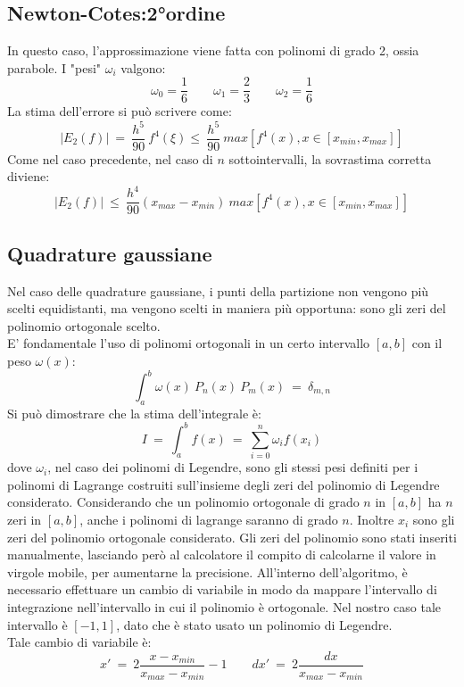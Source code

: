 \subsection*{Newton-Cotes:2°ordine}
In questo caso, l'approssimazione viene fatta con polinomi di grado 2, ossia parabole.
I "pesi" $\omega_i$ valgono:
$$
	\omega_0 = \frac{1}{6} \qquad  \omega_1 = \frac{2}{3} \qquad \omega_2 = \frac{1}{6}
$$
La stima dell'errore si può scrivere come:
$$
|E_2 (f) | \ = \  \frac{h^5}{90} \ f^4(\xi) \leq \ \frac{h^5}{90} \ max \left[ f^4( x), x \in [x_{min},x_{max}] \right]
$$
Come nel caso precedente, nel caso di $n$ sottointervalli, la sovrastima corretta diviene:
$$
|E_2 (f) | \ \leq \ \frac{h^4}{90} \left( x_{max} - x_{min} \right) \ max \left[ f^4( x), x \in [x_{min},x_{max}] \right]
$$

\subsection*{Quadrature gaussiane}
Nel caso delle quadrature gaussiane, i punti della partizione non vengono più scelti equidistanti,
ma vengono scelti in maniera più opportuna: sono gli zeri del polinomio ortogonale scelto.\\
E' fondamentale l'uso di polinomi ortogonali in un certo intervallo $[a,b]$ con il peso $\omega(x)$:
$$
	\int_a^b \omega(x)\ P_n{(x)} \ P_m{(x)} \ = \ \delta_{m,n}
$$
Si può dimostrare che la stima dell'integrale è:
$$
 I \ = \  \int_a^b f(x) \ = \ \sum_{i=0}^n \omega_i f(x_i)
$$
dove $\omega_i$, nel caso dei polinomi di Legendre, sono gli stessi pesi definiti per i polinomi di Lagrange costruiti sull'insieme degli zeri
del polinomio di Legendre considerato. Considerando che un polinomio ortogonale di grado $n$ in $[a,b]$ ha $n$ zeri in $[a,b]$, anche i polinomi
di lagrange saranno di grado $n$. Inoltre $x_i$ sono gli zeri del polinomio ortogonale considerato.
Gli zeri del polinomio sono stati inseriti manualmente, lasciando però al calcolatore il compito di calcolarne il valore in virgole mobile,
per aumentarne la precisione.
All'interno dell'algoritmo, è necessario effettuare un cambio di variabile in modo da mappare l'intervallo
di integrazione nell'intervallo in cui il polinomio è ortogonale. Nel nostro caso tale intervallo è $[-1,1]$,
dato che è stato usato un polinomio di Legendre.\\
Tale cambio di variabile è:
$$
	x' \ = \ 2 \frac{x - x_{min} }{x_{max}-x_{min}} - 1 \qquad dx'  \ = \ 2 \frac{dx}{x_{max}-x_{min}}
$$
